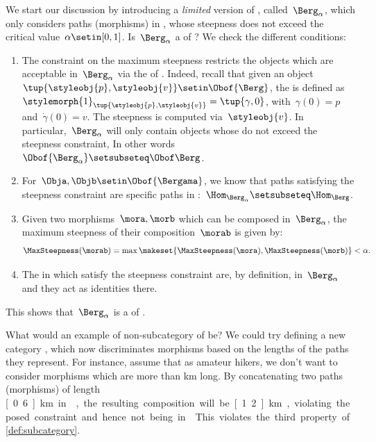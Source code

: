 {%
We start our discussion by introducing a \emph{limited} version of \Berg, called~$\Berg_\alpha$, which only considers paths (morphisms) in \Berg, whose steepness does not exceed the critical value~$\alpha\setin [0,1]$.
Is~$\Berg_\alpha$ a  of \Berg?
We check the different conditions:
\begin{enumerate}
    \item The constraint on the maximum steepness restricts the objects which are acceptable in~$\Berg_\alpha$ via the  of \Berg.
          Indeed, recall that given an object~$\tup{\styleobj{p},\styleobj{v}}\setin \Obof{\Berg}$, the  is defined as~$\stylemorph{1}_{\tup{\styleobj{p},\styleobj{v}}}=\tup{\gamma,0}$, with~$\gamma(0)=p$ and~$\dot{\gamma}(0)=v$.
          The steepness is computed via~$\styleobj{v}$.
          In particular,~$\Berg_\alpha$ will only contain objects whose  do not exceed the steepness constraint, In other words~$\Obof{\Berg_\alpha} \setsubseteq \Obof\Berg$.
    \item For~$\Obja,\Objb\setin \Obof{\Bergama}$, we know that paths satisfying the steepness constraint are specific paths in \Berg:~$\Hom_{\Berg_\alpha}\setsubseteq \Hom_{\Berg}$.
    \item Given two morphisms~$\mora,\morb$ which can be composed in~$\Berg_\alpha$, the maximum steepness of their composition~$\morab$ is given by:
          \begin{equation}
              \MaxSteepness(\morab)
              =
              \max \makeset{
                  \MaxSteepness(\mora),
                  \MaxSteepness(\morb)
              }
              <
              \alpha.
          \end{equation}
    \item The   in \Berg which satisfy the steepness constraint are, by definition, in~$\Berg_\alpha$ and they act as identities there.
\end{enumerate}

This shows that~$\Berg_\alpha$ is a  of \Berg.

What would an example of non-subcategory of \Berg be?
We could try defining a new category \Berglazy, which now discriminates morphisms based on the lengths of the paths they represent.
For instance, assume that as amateur hikers, we don't want to consider morphisms which are more than \unit[1]{km} long.
By concatenating two paths (morphisms) of length \unit[0.6]{km} in \Berglazy, the resulting composition will be \unit[1.2]{km}, violating the posed constraint and hence not being in \Berglazy.
This violates the third property of \cref{def:subcategory}.
}


